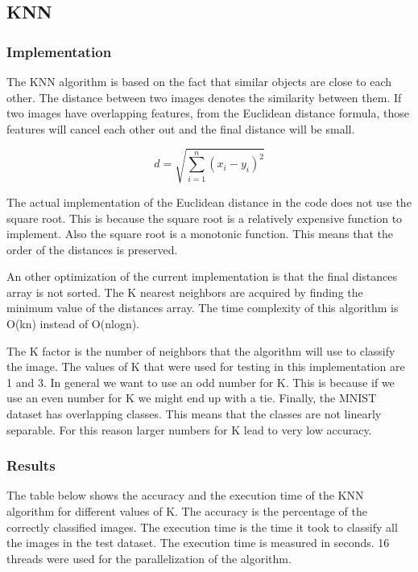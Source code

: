 \subsection*{KNN}
\subsubsection{Implementation}

The KNN algorithm is based on the fact that similar objects are close to each other. The distance between two images
denotes the similarity between them. If two images have overlapping features, from the Euclidean distance formula, those 
features will cancel each other out and the final distance will be small.

\begin{equation}
    d = \sqrt{\sum_{i=1}^{n} (x_i - y_i)^2}
    \label{eq:euclidean}
\end{equation}

The actual implementation of the Euclidean distance in the code does not use the square root. This is because the square root
is a relatively expensive function to implement. Also the square root is a monotonic function. This means that the order of the
distances is preserved.

An other optimization of the current implementation is that the final distances array is not sorted. The
K nearest neighbors are acquired by finding the minimum value of the distances array. The time complexity of this algorithm is
O(kn) instead of O(nlogn).

The K factor is the number of neighbors that the algorithm will use to classify the image. The values of K that were used for 
testing in this implementation are 1 and 3. In general we want to use an odd number for K. This is because if we use an even
number for K we might end up with a tie. Finally, the MNIST dataset has overlapping classes. This means that the classes are
not linearly separable. For this reason larger numbers for K lead to very low accuracy.

\subsubsection{Results}

The table below shows the accuracy and the execution time of the KNN algorithm for different values of K. The accuracy is
the percentage of the correctly classified images. The execution time is the time it took to classify all the images in the
test dataset. The execution time is measured in seconds. 16 threads were used for the parallelization of the algorithm.

